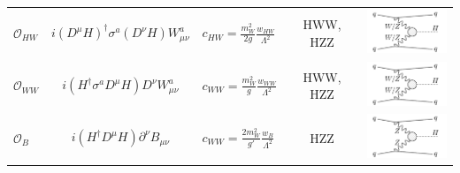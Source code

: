 \begin{tabular}{lcm{3cm}<{\centering}cm{4.5cm}<{\centering}}
    $\mathcal{O}_{HW}$ & $i(D^\mu H)^{\dagger}\sigma^a(D^\nu H)W^a_{\mu\nu}$ & $c_{HW}=\frac{m_W^2}{2g}\frac{w_{HW}}{\Lambda^2}$ & HWW, HZZ  & \vspace{.1cm}\includegraphics[width=2.5cm]{Figures/eft/eft_feynman/cHW.pdf} \\

    $\mathcal{O}_{WW}$ & $i(H^{\dagger}\sigma^aD^\mu H)D^\nu W^a_{\mu\nu}$ & $c_{WW}=\frac{m_W^2}{g}\frac{w_{WW}}{\Lambda^2}$ & HWW, HZZ & \vspace{.1cm}\includegraphics[width=2.5cm]{Figures/eft/eft_feynman/cHW.pdf} \\

    $\mathcal{O}_B$ & $i(H^{\dagger}D^\mu H)\partial^\nu B_{\mu\nu}$ & $c_{WW}=\frac{2m_W^2}{g'}\frac{w_{B}}{\Lambda^2}$ & HZZ & \vspace{.1cm}\includegraphics[width=2.5cm]{Figures/eft/eft_feynman/cB.pdf} \\

\end{tabular}